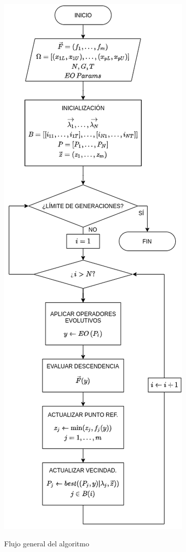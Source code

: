 \begin{minipage}[H]{0.53\textwidth}
\begin{itemize}
\end{itemize}
\end{minipage}\hfill\begin{minipage}[H]{0.4\textwidth}
    \begin{figure}[H]
    \centering
    \includegraphics[scale=0.4]{figures/flowchart.png}\\
    \caption{\centering Flujo general del algoritmo}
    \label{fig:1}
\end{figure}
\end{minipage}\\


